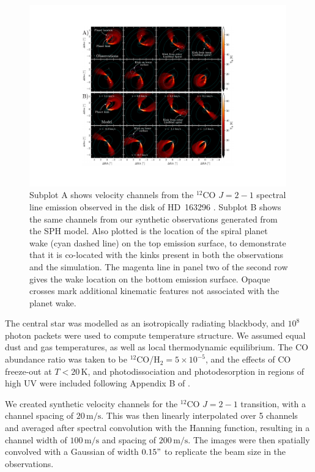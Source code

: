 \begin{figure}[H]
    \centering
    \includegraphics[width = 0.99\textwidth]{figures/calcino_sims.pdf}
    \caption{Subplot A shows velocity channels from the $^{12}$CO $J=2-1$ spectral line emission observed in the disk of HD~163296 \citep{oberg2021}. Subplot B shows the same channels from our synthetic observations generated from the SPH model. Also plotted is the location of the spiral planet wake (cyan dashed line) on the top emission surface, to demonstrate that it is co-located with the kinks present in both the observations and the simulation. The magenta line in panel two of the second row gives the wake location on the bottom emission surface. Opaque crosses mark additional kinematic features not associated with the planet wake.}
    \label{fig:calcino_channels}
\end{figure}

The central star was modelled as an isotropically radiating blackbody, and $10^8$ photon packets were used to compute temperature structure.
We assumed equal dust and gas temperatures, as well as local thermodynamic equilibrium.
The CO abundance ratio was taken to be $^{12}$CO/H$_2 = 5\times 10^{-5}$, and the effects of CO freeze-out at $T < 20\, \mathrm{K}$, and photodissociation and photodesorption in regions of high UV were included following Appendix B of \citet{pinte2018}.

We created synthetic velocity channels for the $^{12}$CO $J=2-1$ transition, with a channel spacing of $20 \, \mathrm{m/s}$.
This was then linearly interpolated over 5 channels and averaged after spectral convolution with the Hanning function, resulting in a channel width of $100 \, \mathrm{m/s}$ and spacing of $200 \, \mathrm{m/s}$.
The images were then spatially convolved with a Gaussian of width $0.15"$ to replicate the beam size in the observations.

